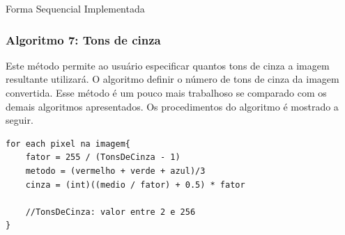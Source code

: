 \begin{subsection}{Forma Sequencial Implementada}
\subsubsection{Algoritmo 7: Tons de cinza}
Este método permite ao usuário especificar quantos tons de cinza a imagem
resultante utilizará. O algoritmo definir o número de tons de cinza da imagem
convertida. Esse método é um pouco mais trabalhoso se comparado com os demais
algoritmos apresentados. Os procedimentos do algoritmo é mostrado a seguir.


\begin{lstlisting}
for each pixel na imagem{
	fator = 255 / (TonsDeCinza - 1)
	metodo = (vermelho + verde + azul)/3
	cinza = (int)((medio / fator) + 0.5) * fator

	//TonsDeCinza: valor entre 2 e 256
}
\end{lstlisting}

\end{subsection}

